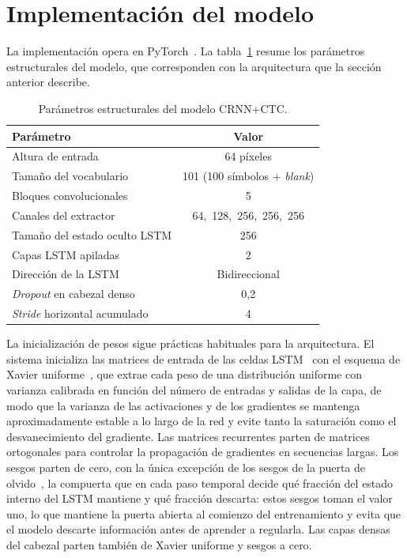 \section{Implementación del modelo}
\label{sec:implementacion-modelo}

La implementación opera en PyTorch~\cite{paszke2019pytorch}. La tabla~\ref{tab:hiperparams-modelo} resume los parámetros estructurales del modelo, que corresponden con la arquitectura que la sección anterior describe.

\begin{table}[!htbp]
	\centering
	\caption{Parámetros estructurales del modelo CRNN+CTC.}
	\label{tab:hiperparams-modelo}
	\begin{tabular}{lc}
		\toprule
		\textbf{Parámetro} & \textbf{Valor} \\
		\midrule
		Altura de entrada                 & 64 píxeles \\
		Tamaño del vocabulario            & 101 (100 símbolos + \textit{blank}) \\
		Bloques convolucionales           & 5 \\
		Canales del extractor             & 64,\ 128,\ 256,\ 256,\ 256 \\
		Tamaño del estado oculto LSTM     & 256 \\
		Capas LSTM apiladas               & 2 \\
		Dirección de la LSTM              & Bidireccional \\
		\textit{Dropout} en cabezal denso & 0,2 \\
		\textit{Stride} horizontal acumulado & 4 \\
		\bottomrule
	\end{tabular}
\end{table}

La inicialización de pesos sigue prácticas habituales para la arquitectura. El sistema inicializa las matrices de entrada de las celdas LSTM~\cite{hochreiter1997lstm} con el esquema de Xavier uniforme~\cite{glorot2010xavier}, que extrae cada peso de una distribución uniforme con varianza calibrada en función del número de entradas y salidas de la capa, de modo que la varianza de las activaciones y de los gradientes se mantenga aproximadamente estable a lo largo de la red y evite tanto la saturación como el desvanecimiento del gradiente. Las matrices recurrentes parten de matrices ortogonales para controlar la propagación de gradientes en secuencias largas. Los sesgos parten de cero, con la única excepción de los sesgos de la puerta de olvido~\cite{gers2000forget}, la compuerta que en cada paso temporal decide qué fracción del estado interno del LSTM mantiene y qué fracción descarta: estos sesgos toman el valor uno, lo que mantiene la puerta abierta al comienzo del entrenamiento y evita que el modelo descarte información antes de aprender a regularla. Las capas densas del cabezal parten también de Xavier uniforme y sesgos a cero.

